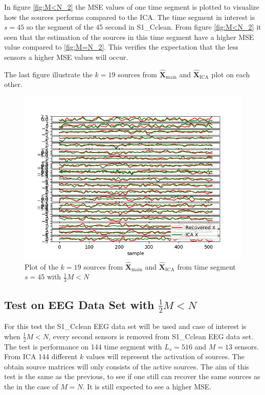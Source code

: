 In figure \ref{fig:M<N_2} the MSE values of one time segment is plotted to visualize how the sources performs compared to the ICA. The time segment in interest is $s = 45$ so the segment of the 45 second in S1\_Cclean. 
From figure \ref{fig:M<N_2} it seen that the estimation of the sources in this time segment have a higher MSE value compared to \ref{fig:M=N_2}. This verifies the expectation that the less sensors a higher MSE values will occur.

The last figure illustrate the $k = 19$ sources from $\hat{\mathbf{X}}_{\text{main}}$ and $\hat{\mathbf{X}}_{\text{ICA}}$ plot on each other.
\begin{figure}[H]
    \centering
	\includegraphics[scale=0.5]{figures/ch_7/Sources_3M_N.png}
	\caption{Plot of the $k = 19$ sources from $\hat{\mathbf{X}}_{\text{main}}$ and $\hat{\mathbf{X}}_{\text{ICA}}$ from time segment $s = 45$ with $\frac{1}{3} M<N$}
	\label{fig:M<N_3}
\end{figure} 
\noindent

\subsection{Test on EEG Data Set with $\frac{1}{2} M<N$}
For this test the S1\_Cclean EEG data set will be used and case of interest is when $\frac{1}{2} M < N$, every second sensors is removed from S1\_Cclean EEG data set. The test is performance on 144 time segment with $L_s = 516$ and $M = 13$ sensors. From ICA 144 different $k$ values will represent the activation of sources. The obtain source matrices will only consists of the active sources.
The aim of this test is the same as the previous, to see if one still can recover the same sources as the in the case of $M=N$. It is still expected to see a higher MSE.

